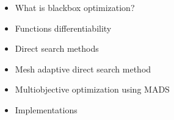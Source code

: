 \documentclass[8pt]{beamer}
\begin{document}
\begin{frame}{}
  \begin{itemize}
  \item {\color{mygray} What is blackbox optimization?}
  \vspace{0.5cm}
  \item {\color{mygray} Functions differentiability}
  \vspace{0.5cm}
  \item {\color{mygray} Direct search methods}
  \vspace{0.5cm}
  \item {\color{mygray} Mesh adaptive direct search method}
  \vspace{0.5cm}
  \item {Multiobjective optimization using MADS}
  \vspace{0.5cm}
  \item {\color{mygray} Implementations}
  \end{itemize}
\end{frame}








\end{document}
